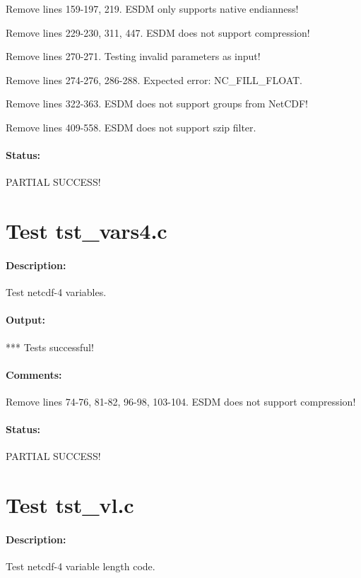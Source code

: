 Remove lines 159-197, 219. ESDM only supports native endianness!

Remove lines 229-230, 311, 447. ESDM does not support compression!

Remove lines 270-271. Testing invalid parameters as input!

Remove lines 274-276, 286-288. Expected error: NC\_FILL\_FLOAT.

Remove lines 322-363. ESDM does not support groups from NetCDF!

Remove lines 409-558. ESDM does not support szip filter.

\paragraph{Status:} PARTIAL SUCCESS!

\section{Test tst\_vars4.c}

\paragraph{Description:} Test netcdf-4 variables.

\paragraph{Output:} *** Tests successful!

\paragraph{Comments:} Remove lines 74-76, 81-82, 96-98, 103-104. ESDM does not support compression!

\paragraph{Status:} PARTIAL SUCCESS!

\section{Test tst\_vl.c}

\paragraph{Description:} Test netcdf-4 variable length code.

